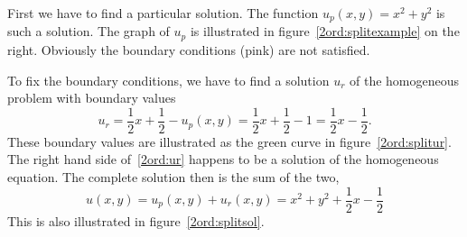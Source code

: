\begin{beispiel}
First we have to find a particular solution.
The function $u_p(x,y)=x^2+y^2$ is such a solution.
The graph of $u_p$ is illustrated in 
figure~\ref{2ord:splitexample} on the right.
Obviously the boundary conditions (pink) are not satisfied.

To fix the boundary conditions, we have to find a solution $u_r$ of the
homogeneous problem with boundary values 
\begin{equation}
u_r
=
\frac12x+\frac12-u_p(x,y)
= 
\frac12x+\frac12-1
=
\frac12x-\frac12.
\label{2ord:ur}
\end{equation}
These boundary values are illustrated as the green curve in 
figure~\ref{2ord:splitur}.
The right hand side of~\eqref{2ord:ur} happens to be a solution
of the homogeneous equation.
The complete solution then is the sum of the two,
\[
u(x,y)
=
u_p(x,y)+u_r(x,y)
=
x^2 + y^2 + \frac12x-\frac12
\]
This is also illustrated in figure~\ref{2ord:splitsol}.
\end{beispiel}

